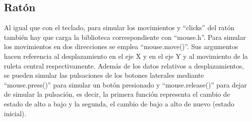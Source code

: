 \subsection{Ratón} \label{s3_6_2}

Al igual que con el teclado, para simular los movimientos y ``clicks'' del ratón también hay que carga la biblioteca correspondiente con ``mouse.h''. Para simular los movimientos en dos direcciones se emplea ``mouse.move()''. Sus argumentos hacen referencia al desplazamiento en el eje X y en el eje Y y al movimiento de la ruleta central respectivamente. Además de los datos relativos a desplazamientos, se pueden simular las pulsaciones de los botones laterales mediante ``mouse.press()'' para simular un botón presionado y ``mouse.release()'' para dejar de simular la pulsación, es decir, la primera función representa el cambio de estado de alto a bajo y la segunda, el cambio de bajo a alto de nuevo (estado inicial).















